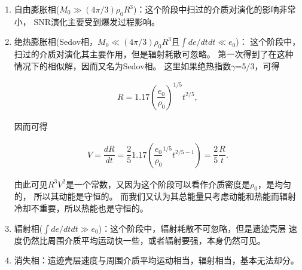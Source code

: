 \begin{enumerate}

    \item 自由膨胀相($M_0\gg(4\pi/3)\rho_0R^3$)：这个阶段中扫过的介质对演化的影响非常小，
    SNR演化主要受到爆发过程影响。

    \item 绝热膨胀相(Sedov相，$M_0\ll(4\pi/3)\rho_0R^3$且$\int de/dt dt\ll e_0$)：
    这个阶段中，扫过的介质对演化其主要作用，但是辐射耗散可忽略。
    \citet{1959sdmm.book.....S}第一次得到了在这种情况下的相似解，因而又名为Sedov相。
    这里如果绝热指数$\gamma$=5/3，可得

    \begin{equation}
      \begin{aligned}
        R = 1.17(\dfrac{e_0}{\rho_0})^{1/5}t^{2/5},
      \end{aligned}
    \end{equation}

    因而可得

    \begin{equation}
      \begin{aligned}
        V = \dfrac{dR}{dt} = \dfrac{2}{5}1.17(\dfrac{e_0}{\rho_0}^{1/5}t^{2/5-1}) = \dfrac{2}{5}\dfrac{R}{t}.
      \end{aligned}
    \end{equation}

    由此可见$R^3V^2$是一个常数，又因为这个阶段可以看作介质密度是$\rho_0$，是均匀的，
    所以其动能是守恒的。
    而我们又认为其总能量只考虑动能和热能而辐射冷却不重要，所以热能也是守恒的。

    \item 辐射相($\int de/dt dt\gg e_0$)：这个阶段中，辐射耗散不可忽略，但是遗迹壳层
    速度仍然比周围介质平均运动快一些，或者辐射要强，本身仍然可见。

    \item 消失相：遗迹壳层速度与周围介质平均运动相当，辐射相当，基本无法却分。

\end{enumerate}

